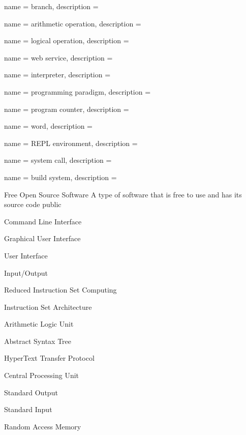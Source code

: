  {
  name = {branch},
  description = {}
}

 {
  name = {arithmetic operation},
  description = {}
}

 {
  name = {logical operation},
  description = {}
}

 {
  name = {web service},
  description = {}
}

 {
  name = {interpreter},
  description = {}
}

 {
  name = {programming paradigm},
  description = {}
}

 {
  name = {program counter},
  description = {}
}

 {
  name = {word},
  description = {}
}

 {
  name = {REPL environment},
  description = {}
}

 {
  name = {system call},
  description = {}
}

 {
  name = {build system},
  description = {}
}


{Free Open Source Software}
{A type of software that is free to use and has its source code public}

{Command Line Interface}
{}

{Graphical User Interface}
{}

{User Interface}
{}


{Input/Output}
{}

{Reduced Instruction Set Computing}
{}

{Instruction Set Architecture}
{}

{Arithmetic Logic Unit}
{}

{Abstract Syntax Tree}
{}

{HyperText Transfer Protocol}
{}

{Central Processing Unit}
{}

{Standard Output}
{}

{Standard Input}
{}

{Random Access Memory}
{}


